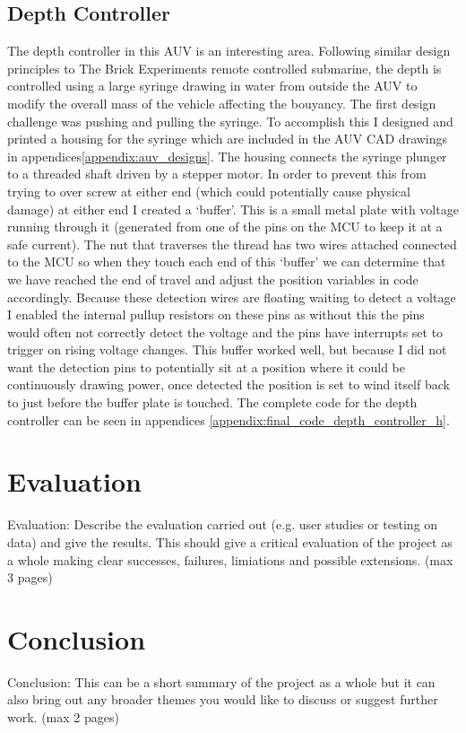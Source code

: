 \documentclass[11pt,a4paper,titlepage]{report}
\begin{document}
	\section*{Depth Controller}
	The depth controller in this AUV is an interesting area. Following similar design principles to The Brick Experiments remote controlled submarine, the depth is controlled using a large syringe drawing in water from outside the AUV to modify the overall mass of the vehicle affecting the bouyancy. The first design challenge was pushing and pulling the syringe. To accomplish this I designed and printed a housing for the syringe which are included in the AUV CAD drawings in appendices\ref{appendix:auv_designs}. The housing connects the syringe plunger to a threaded shaft driven by a stepper motor. In order to prevent this from trying to over screw at either end (which could potentially cause physical damage) at either end I created a `buffer'. This is a small metal plate with voltage running through it (generated from one of the pins on the MCU to keep it at a safe current). The nut that traverses the thread has two wires attached connected to the MCU so when they touch each end of this `buffer' we can determine that we have reached the end of travel and adjust the position variables in code accordingly. Because these detection wires are floating waiting to detect a voltage I enabled the internal pullup resistors on these pins as without this the pins would often not correctly detect the voltage and the pins have interrupts set to trigger on rising voltage changes. This buffer worked well, but because I did not want the detection pins to potentially sit at a position where it could be continuously drawing power, once detected the position is set to wind itself back to just before the buffer plate is touched. The complete code for the depth controller can be seen in appendices \ref{appendix:final_code_depth_controller_h}.
	
	
	\chapter*{Evaluation}
	Evaluation: Describe the evaluation carried out (e.g. user studies or testing on data) and give the results. This should give a critical evaluation of the project as a whole making clear successes, failures, limiations and possible extensions. (max 3 pages)
	
	\chapter*{Conclusion}
	Conclusion: This can be a short summary of the project as a whole but it can also bring out any broader themes you would like to discuss or suggest further work. (max 2 pages)
	
\end{document}
